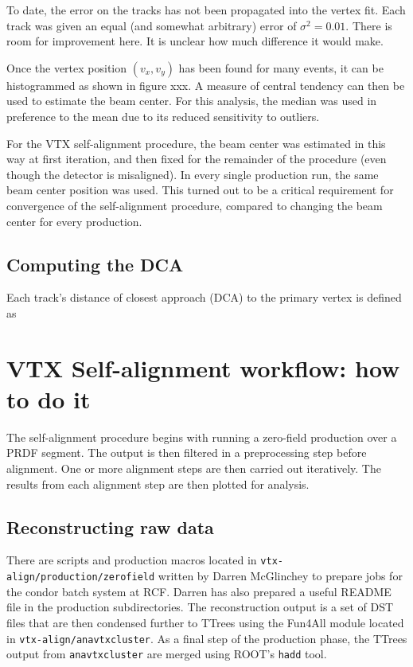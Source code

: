\documentclass[12pt]{article}
\begin{document}
To date, the error on the tracks has not been propagated into the vertex fit. Each track was given an equal (and somewhat arbitrary) error of $\sigma^2 = 0.01$. There is room for improvement here. It is unclear how much difference it would make.

Once the vertex position $(v_x, v_y)$ has been found for many events, it can be histogrammed as shown in figure xxx. A measure of central tendency can then be used to estimate the beam center. For this analysis, the median was used in preference to the mean due to its reduced sensitivity to outliers.

For the VTX self-alignment procedure, the beam center was estimated in this way at first iteration, and then fixed for the remainder of the procedure (even though the detector is misaligned). In every single production run, the same beam center position was used. This turned out to be a critical requirement for convergence of the self-alignment procedure, compared to changing the beam center for every production. 

\subsection{Computing the DCA}
Each track's distance of closest approach (DCA) to the primary vertex is defined as

\section{VTX Self-alignment workflow: how to do it}
The self-alignment procedure begins with running a zero-field production over a PRDF segment. The output is then filtered in a preprocessing step before alignment. One or more alignment steps are then carried out iteratively. The results from each alignment step are then plotted for analysis.

\subsection{Reconstructing raw data}
There are scripts and production macros located in \texttt{vtx-align/production/zerofield} written by Darren McGlinchey to prepare jobs for the condor batch system at RCF. Darren has also prepared a useful README file in the production subdirectories. The reconstruction output is a set of DST files that are then condensed further to TTrees using the Fun4All module located in \texttt{vtx-align/anavtxcluster}. As a final step of the production phase, the TTrees output from \texttt{anavtxcluster} are merged using ROOT's \texttt{hadd} tool.
\end{document}
